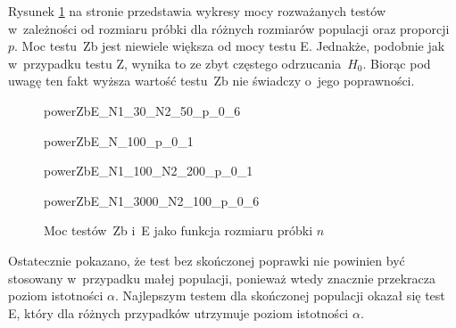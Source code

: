 Rysunek \ref{powerZbE_n} na stronie \pageref{powerZbE_n} przedstawia wykresy mocy rozważanych testów w~zależności od rozmiaru próbki dla różnych rozmiarów populacji oraz proporcji $p$. Moc testu~Zb jest niewiele większa od mocy testu E. Jednakże, podobnie jak w~przypadku testu Z, wynika to ze zbyt częstego odrzucania~$H_0$. Biorąc pod uwagę ten fakt wyższa wartość testu~Zb nie świadczy o~jego poprawności.

\begin{figure}[!h]
	\begin{subdiagram}{powerZbE_N1_30_N2_50_p_0_6}
	\end{subdiagram}
	\begin{subdiagram}{powerZbE_N_100_p_0_1}
	\end{subdiagram}
	\begin{subdiagram}{powerZbE_N1_100_N2_200_p_0_1}
	\end{subdiagram}
	\begin{subdiagram}{powerZbE_N1_3000_N2_100_p_0_6}
	\end{subdiagram}

	\caption{Moc testów~Zb i~E jako funkcja rozmiaru próbki $n$}
	\label{powerZbE_n}
\end{figure}

Ostatecznie pokazano, że test bez skończonej poprawki nie powinien być stosowany w~przypadku małej populacji, ponieważ wtedy znacznie przekracza poziom istotności $\alpha$. Najlepszym testem dla skończonej populacji okazał się test E, który dla różnych przypadków utrzymuje poziom istotności $\alpha$. 